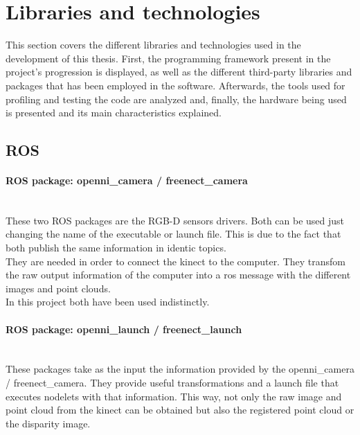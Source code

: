 \section{Libraries and technologies}
\label{libraries_and_technologies}

This section covers the different libraries and technologies used in the development of this thesis. First, the programming framework present in the project's progression is displayed, as well as the different third-party libraries and packages that has been employed in the software. Afterwards, the tools used for profiling and testing the code are analyzed and, finally, the hardware being used is presented and its main characteristics explained. 




	\subsection{ROS}
		\label{technologies_ros}
		\paragraph{ROS package: openni\_camera / freenect\_camera}\mbox{} \\

		These two ROS packages are the RGB-D sensors drivers. Both can be used just changing the name of the executable or launch file. This is due to the fact that both publish the same information in identic topics. 
		\\

		They are needed in order to connect the kinect to the computer. They transfom the raw output information of the computer into a ros message with the different images and point clouds. 
		\\

		In this project both have been used indistinctly.  

		\paragraph{ROS package: openni\_launch / freenect\_launch}\mbox{} \\

		These packages take as the input the information provided by the openni\_camera / freenect\_camera. They provide useful transformations and a launch file that executes nodelets with that information. This way, not only the raw image and point cloud from the kinect can be obtained but also the registered point cloud or the disparity image. 
		\\

